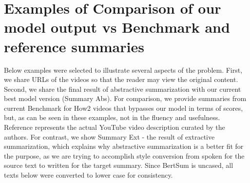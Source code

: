 \documentclass[sigconf]{acmart}
\begin{document}
\section{Examples of Comparison of our model output vs Benchmark \cite{palaskar-etal-2019-multimodal} and reference summaries}
\label{AppendixC}
Below examples were selected to illustrate several aspects of the problem. First, we share URLs of the videos so that the reader may view the original content. Second, we share the final result of abstractive summarization with our current best model version (Summary Abs). For comparison, we provide summaries from current Benchmark for How2 videos that bypasses our model in terms of scores, but, as can be seen in these examples, not in the fluency and usefulness. Reference represents the actual YouTube video description curated by the authors. For contrast, we show Summary Ext - the result of extractive summarization, which explains why abstractive summarization is a better fit for the purpose, as we are trying to accomplish style conversion from spoken for the source text to written for the target summary. Since BertSum is uncased, all texts below were converted to lower case for consistency. 
\end{document}
